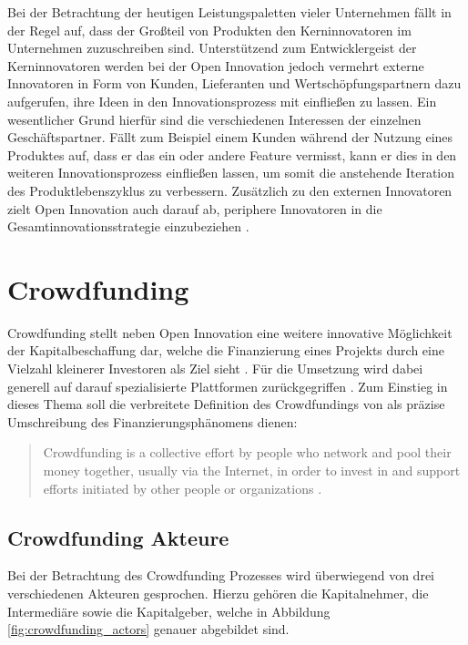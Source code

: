 Bei der Betrachtung der heutigen Leistungspaletten vieler Unternehmen fällt in der Regel auf, dass der Großteil von Produkten den Kerninnovatoren im Unternehmen zuzuschreiben sind. Unterstützend zum Entwicklergeist der Kerninnovatoren werden bei der Open Innovation jedoch vermehrt externe Innovatoren in Form von Kunden, Lieferanten und Wertschöpfungspartnern dazu aufgerufen, ihre Ideen in den Innovationsprozess mit einfließen zu lassen. Ein wesentlicher Grund hierfür sind die verschiedenen Interessen der einzelnen Geschäftspartner. Fällt zum Beispiel einem Kunden während der Nutzung eines Produktes auf, dass er das ein oder andere Feature vermisst, kann er dies in den weiteren Innovationsprozess einfließen lassen, um somit die anstehende Iteration des Produktlebenszyklus zu verbessern. Zusätzlich zu den externen Innovatoren zielt Open Innovation auch darauf ab, periphere Innovatoren in die Gesamtinnovationsstrategie einzubeziehen \cite[91\psq]{Zerfaß2009}.

\section{Crowdfunding}
Crowdfunding stellt neben Open Innovation eine weitere innovative Möglichkeit der Kapitalbeschaffung dar, welche die Finanzierung eines Projekts durch eine Vielzahl kleinerer Investoren als Ziel sieht \cite[59\psq]{Himmer2019}. Für die Umsetzung wird dabei generell auf darauf spezialisierte Plattformen zurückgegriffen \cite{Sixt2014}. Zum Einstieg in dieses Thema soll die verbreitete Definition des Crowdfundings von \citeauthor{ordani} als präzise Umschreibung des Finanzierungsphänomens dienen: 

\begin{quote}
	\glqq Crowdfunding is a collective effort by people who network and pool their money together, usually via the Internet, in order to invest in and support efforts initiated by other people or organizations \cite{ordani}.\grqq{}
\end{quote}

\subsection{Crowdfunding Akteure}
Bei der Betrachtung des Crowdfunding Prozesses wird überwiegend von drei verschiedenen Akteuren gesprochen. Hierzu gehören die Kapitalnehmer, die Intermediäre sowie die Kapitalgeber, welche in Abbildung \ref{fig:crowdfunding_actors} genauer abgebildet sind. 

